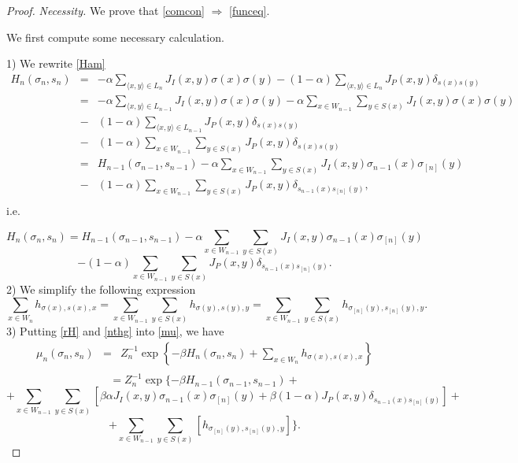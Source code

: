 \documentclass[sn-mathphys]{sn-jnl}%
\theoremstyle{thmstyleone}%
\theoremstyle{thmstyletwo}%
\theoremstyle{thmstylethree}%
\begin{document}
\begin{proof}
\emph{Necessity.} We prove that \eqref{comcon} $\Rightarrow$ \eqref{funceq}.

We first compute some necessary calculation.

1) We rewrite \eqref{Ham}
\begin{eqnarray*}
H_n(\sigma_n, s_n)&=&-\alpha \sum_{\langle x,y\rangle \in L_n}J_{I}(x,y)\sigma(x)\sigma(y)-(1-\alpha)\sum_{\langle x,y\rangle \in L_n}J_{P}(x,y)\delta_{s(x)s(y)}\\[2mm]
&=&-\alpha \sum_{\langle x,y\rangle \in L_{n-1}}J_{I}(x,y)\sigma(x)\sigma(y)
-\alpha\sum_{x\in W_{n-1}}\sum_{y\in S(x)}J_{I}(x,y)\sigma(x)\sigma(y)\\[2mm]
&-&(1-\alpha) \sum_{\langle x,y\rangle \in L_{n-1}}J_{P}(x,y)\delta_{s(x)s(y)}\\[2mm]
&-&(1-\alpha)\sum_{x\in W_{n-1}}\sum_{y\in S(x)}J_{P}(x,y)\delta_{s(x)s(y)}\\[2mm]
&=&H_{n-1}(\sigma_{n-1}, s_{n-1})-\alpha\sum_{x\in W_{n-1}}\sum_{y\in S(x)}J_{I}(x,y)\sigma_{n-1}(x)\sigma_{[n]}(y)\\[2mm]
&-&(1-\alpha)\sum_{x\in W_{n-1}}\sum_{y\in S(x)}J_{P}(x,y)\delta_{s_{n-1}(x)s_{[n]}(y)},\\[2mm]
\end{eqnarray*}
i.e.

$$H_n(\sigma_n, s_n)=H_{n-1}(\sigma_{n-1}, s_{n-1})-\alpha\sum_{x\in W_{n-1}}\sum_{y\in S(x)}J_{I}(x,y)\sigma_{n-1}(x)\sigma_{[n]}(y)$$
\begin{equation}\label{rH}
-(1-\alpha)\sum_{x\in W_{n-1}}\sum_{y\in S(x)}J_{P}(x,y)\delta_{s_{n-1}(x)s_{[n]}(y)}.
\end{equation}
2) We simplify the following expression
\begin{equation}\label{nthg}
\sum _{x\in W_n}h_{\sigma(x),s(x),x}=\sum_{x\in W_{n-1}}\sum_{y\in S(x)}h_{\sigma(y),s(y),y}=\sum_{x\in W_{n-1}}\sum_{y\in S(x)}h_{\sigma_{[n]}(y),s_{[n]}(y),y}.
\end{equation}
3) Putting \eqref{rH} and \eqref{nthg} into \eqref{mu}, we have
\begin{eqnarray*}
\mu_{n}(\sigma_n, s_n)&=&Z_{n}^{-1}\exp\left\{-\beta H_n(\sigma_n,s_n)+\sum _{x\in
W_n}h_{\sigma(x),s(x),x}\right\}\\[2mm]
\end{eqnarray*}
$$=Z_n^{-1}\exp\{-\beta H_{n-1}(\sigma_{n-1},s_{n-1})+$$ $$+\sum_{x\in W_{n-1}}\sum_{y\in S(x)}\left[\beta \alpha  J_{I}(x,y)\sigma_{n-1}(x)\sigma_{[n]}(y)
+\beta (1-\alpha) J_{P}(x,y)\delta_{s_{n-1}(x)s_{[n]}(y)}\right]+$$ $$+\sum_{x\in W_{n-1}}\sum_{y\in S(x)}\left[ h_{\sigma_{[n]}(y),s_{[n]}(y),y}\right]\}.$$


\end{proof}
\end{document}
